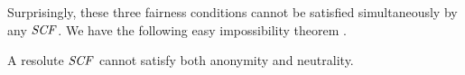 Surprisingly, these three fairness conditions cannot be satisfied simultaneously
by any $\it{SCF}$. We have the following easy impossibility theorem \cite{Brandt:COMSOC}.

\begin{thm}
\label{thm:easy}
	A resolute $\it{SCF}$ cannot satisfy both anonymity and neutrality.
\end{thm}
%

%
%
%
%

